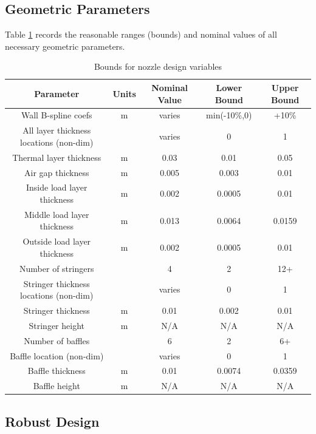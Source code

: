 \documentclass{article}
\begin{document}
\subsection{Geometric Parameters}

Table \ref{tab:geoParams} records the reasonable ranges (bounds) and nominal values of all necessary geometric parameters.

\begin{table}
\caption[Bounds for design variables]{Bounds for nozzle design variables}
\label{tab:geoParams}
\begin{center}
\begin{tabular}[]{ c | c | c | c | c}
\textbf{Parameter} & \textbf{Units} & \textbf{Nominal Value} & \textbf{Lower Bound} & \textbf{Upper Bound} \\ \hline
Wall B-spline coefs & m & varies & min(-10\%,0) & +10\% \\ \hline
All layer thickness locations (non-dim) & & varies & 0 & 1 \\ \hline
Thermal layer thickness & m & 0.03 & 0.01 & 0.05 \\ \hline
Air gap thickness & m & 0.005 & 0.003 & 0.01 \\ \hline
Inside load layer thickness & m & 0.002 & 0.0005 & 0.01 \\ \hline
Middle load layer thickness & m & 0.013 & 0.0064 & 0.0159 \\ \hline
Outside load layer thickness & m & 0.002 & 0.0005 & 0.01 \\ \hline
Number of stringers & & 4 & 2 & 12+ \\ \hline
Stringer thickness locations (non-dim) & & varies & 0 & 1 \\ \hline
Stringer thickness & m & 0.01 & 0.002 & 0.01 \\ \hline
Stringer height & m & N/A & N/A & N/A \\ \hline
Number of baffles & & 6 & 2 & 6+ \\ \hline
Baffle location (non-dim) &  & varies & 0 & 1 \\ \hline
Baffle thickness & m & 0.01 & 0.0074 & 0.0359 \\ \hline
Baffle height & m & N/A & N/A & N/A \\ \hline
\end{tabular}
\end{center}
\end{table}

\subsection{Robust Design}
\end{document}
